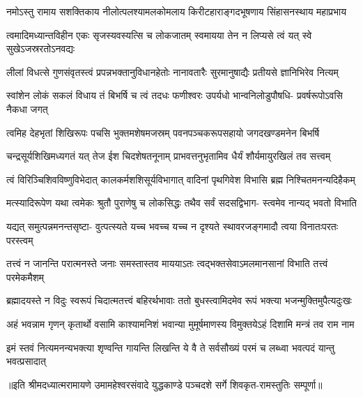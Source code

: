 

\addtocounter{shlokacount}{50}

\fourlineindentedshloka
{नमोऽस्तु रामाय सशक्तिकाय}
{नीलोत्पलश्यामलकोमलाय}
{किरीटहाराङ्गदभूषणाय}
{सिंहासनस्थाय महाप्रभाय} %

\fourlineindentedshloka
{त्वमादिमध्यान्तविहीन एकः}
{सृजस्यवस्यत्सि च लोकजातम्}
{स्वमायया तेन न लिप्यसे त्वं}
{यत् स्वे सुखेऽजस्ररतोऽनवद्यः} %

\fourlineindentedshloka
{लीलां विधत्से गुणसंवृतस्त्वं}
{प्रपन्नभक्तानुविधानहेतोः}
{नानावतारैः सुरमानुषाद्यैः}
{प्रतीयसे ज्ञानिभिरेव नित्यम्} %

\fourlineindentedshloka
{स्वांशेन लोकं सकलं विधाय तं}
{बिभर्षि च त्वं तदधः फणीश्वरः}
{उपर्यधो भान्वनिलोडुपौषधि-}
{प्रवर्षरूपोऽवसि नैकधा जगत्} %

\fourlineindentedshloka
{त्वमिह देहभृतां शिखिरूपः}
{पचसि भुक्तमशेषमजस्रम्}
{पवनपञ्चकरूपसहायो}
{जगदखण्डमनेन बिभर्षि} %

\fourlineindentedshloka
{चन्द्रसूर्यशिखिमध्यगतं यत्}
{तेज ईश चिदशेषतनूनाम्}
{प्राभवत्तनुभृतामिव धैर्यं}
{शौर्यमायुरखिलं तव सत्त्वम्} %

\fourlineindentedshloka
{त्वं विरिञ्चिशिवविष्णुविभेदात्}
{कालकर्मशशिसूर्यविभागात्}
{वादिनां पृथगिवेश विभासि}
{ब्रह्म निश्चितमनन्यदिहैकम्} %

\fourlineindentedshloka
{मत्स्यादिरूपेण यथा त्वमेकः}
{श्रुतौ पुराणेषु च लोकसिद्धः}
{तथैव सर्वं सदसद्विभाग-}
{स्त्वमेव नान्यद् भवतो विभाति} %

\fourlineindentedshloka
{यद्यत् समुत्पन्नमनन्तसृष्टा-}
{वुत्पत्स्यते यच्च भवच्च यच्च}
{न दृश्यते स्थावरजङ्गमादौ}
{त्वया विनातःपरतः परस्त्वम्} %

\fourlineindentedshloka
{तत्त्वं न जानन्ति परात्मनस्ते}
{जनाः समस्तास्तव माययाऽतः}
{त्वद्भक्तसेवाऽमलमानसानां}
{विभाति तत्त्वं परमेकमैशम्} %

\fourlineindentedshloka
{ब्रह्मादयस्ते न विदुः स्वरूपं}
{चिदात्मतत्त्वं बहिरर्थभावाः}
{ततो बुधस्त्वामिदमेव रूपं}
{भक्त्या भजन्मुक्तिमुपैत्यदुःखः} %

\fourlineindentedshloka
{अहं भवन्नाम गृणन् कृतार्थो}
{वसामि काश्यामनिशं भवान्या}
{मुमूर्षमाणस्य विमुक्तयेऽहं}
{दिशामि मन्त्रं तव राम नाम} %

\fourlineindentedshloka
{इमं स्तवं नित्यमनन्यभक्त्या}
{शृण्वन्ति गायन्ति लिखन्ति ये वै}
{ते सर्वसौख्यं परमं च लब्ध्वा}
{भवत्पदं यान्तु भवत्प्रसादात्} %

{॥इति श्रीमदध्यात्मरामायणे उमामहेश्वरसंवादे युद्धकाण्डे पञ्चदशे  सर्गे
शिवकृत-रामस्तुतिः  सम्पूर्णा॥}
